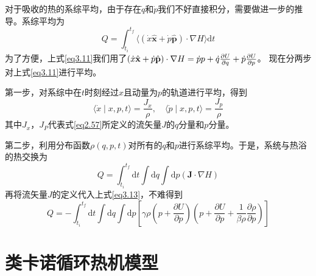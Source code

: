 对于吸收的热的系综平均，由于存在$\dot{q}$和$\dot{p}$我们不好直接积分，需要做进一步的推导。系综平均为
\begin{equation}
    Q=\int_{t_i}^{t_f}\langle(\dot{x} \hat{\mathbf{x}}+\dot{p} \hat{\mathbf{p}}) \cdot \nabla H\rangle \mathrm{d} t
    \label{eq3.11}
\end{equation}
为了方便，上式\eqref{eq3.11}我们用了$(\dot{x} \hat{\mathbf{x}}+\dot{p} \hat{\mathbf{p}}) \cdot \nabla H  = \dot{p} p+\dot{q} \frac{\partial U}{\partial q} +  \dot{p} \frac{\partial U}{\partial p}$。
现在分两步对上式\eqref{eq3.11}进行平均。

第一步，对系综中在$t$时刻经过$x$且动量为$p$的轨道进行平均，得到
\begin{equation}
    \langle\dot{x} \mid x, p, t\rangle=\frac{J_{x}}{\rho}, \quad\langle\dot{p} \mid x, p, t\rangle=\frac{J_{p}}{\rho}
    \label{eq3.12}
\end{equation}
其中$J_x$，$J_P$代表式\eqref{eq2.57}所定义的流矢量$J$的$q$分量和$p$分量。

第二步，利用分布函数$\rho(q,p,t)$对所有的$q$和$p$进行系综平均。于是，系统与热浴的热交换为
\begin{equation}
    Q=\int_{t_i}^{t_f} \mathrm{d} t \int \mathrm{d} q \int \mathrm{d} p(\bm{J} \cdot \nabla H)
    \label{eq3.13}
\end{equation}
再将流矢量$J$的定义代入上式\eqref{eq3.13}，不难得到
\begin{equation}
    Q=-\int_{t_i}^{t_f} \mathrm{d} t \int \mathrm{d} q \int \mathrm{d} p\left[\gamma \rho\left(p+\frac{\partial U}{\partial p}\right)\left(p+\frac{\partial U}{\partial p}+\frac{1}{\beta \rho} \frac{\partial \rho}{\partial p}\right)\right]
    \label{eq3.14}
\end{equation}

































\section{类卡诺循环热机模型}

